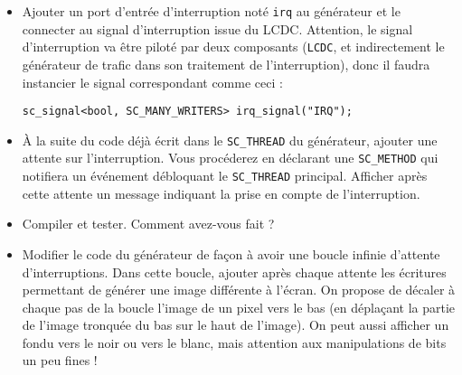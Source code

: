 \documentclass[12pt,a4paper]{article}
\begin{document}
\begin{itemize}
\item Ajouter un port d'entrée d'interruption noté \lstinline|irq| au générateur et le connecter au signal d'interruption issue du LCDC.
  Attention, le signal d'interruption va être piloté par deux composants (\lstinline|LCDC|, et indirectement le générateur de trafic dans son traitement de l'interruption), donc il faudra instancier le signal correspondant comme ceci :
  \begin{lstlisting}
sc_signal<bool, SC_MANY_WRITERS> irq_signal("IRQ");
  \end{lstlisting}
\item À la suite du code déjà écrit dans le \lstinline|SC_THREAD| du générateur, ajouter une attente sur l'interruption.
  Vous procéderez en déclarant une \lstinline|SC_METHOD| qui notifiera un événement débloquant le \lstinline|SC_THREAD| principal.
  Afficher après cette attente un message indiquant la prise en compte de l'interruption.
\item Compiler et tester. Comment avez-vous fait ?
\item Modifier le code du générateur de façon à avoir une boucle infinie d'attente d'interruptions.
   Dans cette boucle, ajouter après chaque attente les écritures permettant de générer une image différente à l'écran.
   On propose de décaler à chaque pas de la boucle l'image de un pixel vers le bas (en déplaçant la partie de l'image tronquée du bas sur le haut de l'image).
   On peut aussi afficher un fondu vers le noir ou vers le blanc, mais attention aux manipulations de bits un peu fines !
\end{itemize}
\end{document}
